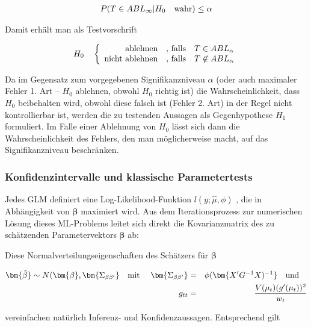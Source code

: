 \begin{eqnarray}  
P(T \in ABL_\infty | H_0 \quad \textnormal{wahr}) \leq \alpha
\end{eqnarray}

Damit erhält man als Testvorschrift


\begin{eqnarray} 
H_0 \quad \left\{ \begin{array}{r@{\quad \textnormal{, falls} \quad}l}
\textnormal{ablehnen} & T \in ABL_\alpha\\
\textnormal{nicht ablehnen} & T \not\in ABL_\alpha\\
\end{array} \right. 
\end{eqnarray}

Da im Gegensatz zum vorgegebenen Signifikanzniveau $\alpha$  (oder auch maximaler Fehler 1. Art –  $H_0$ ablehnen, obwohl  $H_0$ richtig ist) die Wahrscheinlichkeit, dass  $H_0$ beibehalten wird, obwohl diese falsch ist (Fehler 2. Art) in der Regel nicht kontrollierbar ist, werden die zu testenden Aussagen als Gegenhypothese $H_1$  formuliert. Im Falle einer Ablehnung von $H_0$  lässt sich dann die Wahrscheinlichkeit des Fehlers, den man möglicherweise macht, auf das Signifikanzniveau beschränken.

\subsubsection{Konfidenzintervalle und klassische Parametertests}

Jedes GLM definiert eine Log-Likelihood-Funktion $l(y;\hat{\mu},\phi)$ , die in Abhängigkeit von $\bm{\beta}$  maximiert wird. Aus dem Iterationsprozess zur numerischen Lösung dieses ML-Problems leitet sich direkt die Kovarianzmatrix des zu schätzenden Parametervektors $\bm{\beta}$  ab:

Diese Normalverteilungseigenschaften des Schätzers für  $\bm{\beta}$

\begin{eqnarray}   \label{eq:10}
\bm{\hat{\beta}} \sim  N(\bm{\beta},\bm{\Sigma_{\beta\beta'}}   \quad \textnormal{mit } \quad   \bm{\Sigma_{\beta\beta'}}  &=& \phi(\bm{X' G^{-1} X)^{-1}}     \quad \textnormal{und} \quad  \nonumber \\ g_{tt} &=& \frac{V(\mu_t)(g'(\mu_t))^2}{w_t}
\end{eqnarray}


vereinfachen natürlich Inferenz- und Konfidenzaussagen. Entsprechend gilt 

